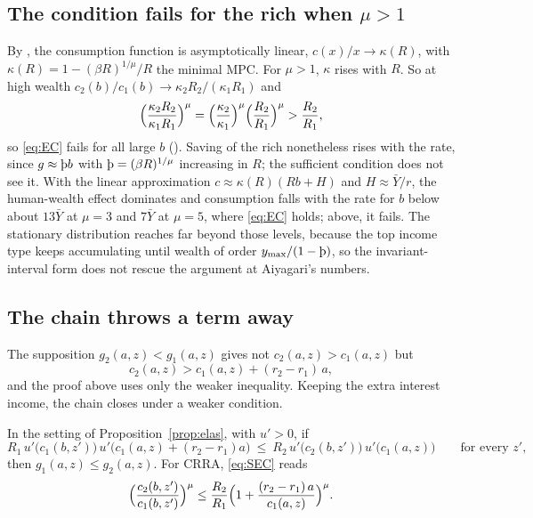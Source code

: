 \subsection{The condition fails for the rich when \texorpdfstring{$\mu>1$}{mu > 1}}

By \citet{MaToda2022}, the consumption function is asymptotically linear, $c(x)/x\to\kappa(R)$,
with $\kappa(R)=1-(\beta R)^{1/\mu}/R$ the minimal MPC. For $\mu>1$, $\kappa$ rises with $R$. So at
high wealth $c_2(b)/c_1(b)\to\kappa_2R_2/(\kappa_1R_1)$ and
\[
  \Bigl(\frac{\kappa_2R_2}{\kappa_1R_1}\Bigr)^{\mu}
  =\Bigl(\frac{\kappa_2}{\kappa_1}\Bigr)^{\mu}\Bigl(\frac{R_2}{R_1}\Bigr)^{\mu}>\frac{R_2}{R_1},
\]
so \eqref{eq:EC} fails for all large $b$ ().
Saving of the rich nonetheless rises with the rate, since $g\approx\Thorn b$ with
$\Thorn=(\beta R)^{1/\mu}$ increasing in $R$; the sufficient condition does not see it. With the
linear approximation $c\approx\kappa(R)(Rb+H)$ and $H\approx\bar Y/r$, the human-wealth effect
dominates and consumption falls with the rate for $b$ below about $13\bar Y$ at $\mu=3$ and
$7\bar Y$ at $\mu=5$, where \eqref{eq:EC} holds; above, it fails. The stationary distribution
reaches far beyond those levels, because the top income type keeps accumulating until wealth of
order $y_{\max}/(1-\Thorn)$, so the invariant-interval form does not rescue the argument at
Aiyagari's numbers.

\subsection{The chain throws a term away}\label{sec:slack}

The supposition $g_2(a,z)<g_1(a,z)$ gives not $c_2(a,z)>c_1(a,z)$ but
\[
  c_2(a,z)>c_1(a,z)+(r_2-r_1)\,a,
\]
and the proof above uses only the weaker inequality. Keeping the extra interest income, the chain
closes under a weaker condition.

\begin{proposition}\label{prop:slack}
In the setting of Proposition~\ref{prop:elas}, with $u'>0$, if
\begin{equation}\label{eq:SEC}
  R_1\,u'\bigl(c_1(b,z')\bigr)\,u'\bigl(c_1(a,z)+(r_2-r_1)a\bigr)
  \ \le\ R_2\,u'\bigl(c_2(b,z')\bigr)\,u'\bigl(c_1(a,z)\bigr)\qquad\text{for every }z',
\end{equation}
then $g_1(a,z)\le g_2(a,z)$. For CRRA, \eqref{eq:SEC} reads
\[
  \Bigl(\frac{c_2(b,z')}{c_1(b,z')}\Bigr)^{\mu}\le\frac{R_2}{R_1}
  \Bigl(1+\frac{(r_2-r_1)\,a}{c_1(a,z)}\Bigr)^{\mu}.
\]
\end{proposition}


